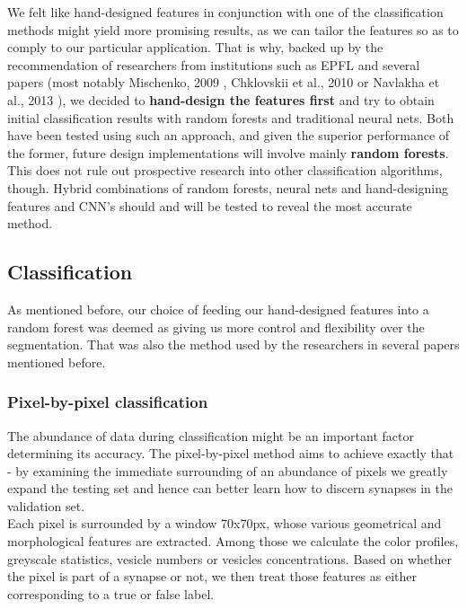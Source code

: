 \documentclass[a4paper, 11pt]{article}
\numberwithin{equation}{section}
\begin{document}
		\noindent We felt like hand-designed features in conjunction with one of the classification methods might yield more promising results, as we can tailor the features so as to comply to our particular application. That is why, backed up by the recommendation of researchers from institutions such as EPFL and several papers (most notably Mischenko, 2009 \cite{mishchenko2009automation}, Chklovskii et al., 2010 \cite{chklovskii2010semi} or Navlakha et al., 2013 \cite{navlakha2013high}), we decided to \textbf{hand-design the features first} and try to obtain initial classification results with random forests and traditional neural nets. Both  have been tested using such an approach, and given the superior performance of the former, future design implementations will involve mainly \textbf{random forests}.\\
		
		\noindent This does not rule out prospective research into other classification algorithms, though. Hybrid combinations of random forests, neural nets and hand-designing features and CNN's should and will be tested to reveal the most accurate method.
		
		\subsection{Classification}
		
		As mentioned before, our choice of feeding our hand-designed features into a random forest was deemed as giving us more control and flexibility over the segmentation. That was also the method used by the researchers in several papers mentioned before.
		
		\subsubsection{Pixel-by-pixel classification}
		The abundance of data during classification might be an important factor determining its accuracy. The pixel-by-pixel method aims to achieve exactly that - by examining the immediate surrounding of an abundance of pixels we greatly expand the testing set and hence can better learn how to discern synapses in the validation set. \\
		Each pixel is surrounded by a window 70x70px, whose various geometrical and morphological features are extracted. Among those we calculate the color profiles, greyscale statistics, vesicle numbers or vesicles concentrations. Based on whether the pixel is part of a synapse or not, we then treat those features as either corresponding to a true or false label. \\
		
\end{document}
